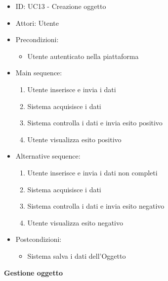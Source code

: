 \documentclass{article}
\begin{document}
\begin{itemize}[label = {-}]
    \itemsep0px
    \item ID: UC13 - Creazione oggetto
    \item Attori: Utente
    \item Precondizioni: 
        \begin{itemize}[label = {-}]
            \item Utente autenticato nella piattaforma
        \end{itemize}
    \item Main sequence: 
        \begin{enumerate}
            \item Utente inserisce e invia i dati
            \item Sistema acquisisce i dati
            \item Sistema controlla i dati e invia esito positivo
            \item Utente visualizza esito positivo
        \end{enumerate}
    \item Alternative sequence:
        \begin{enumerate}
            \item Utente inserisce e invia i dati non completi
            \item Sistema acquisisce i dati
            \item Sistema controlla i dati e invia esito negativo
            \item Utente visualizza esito negativo
        \end{enumerate}
    \item Postcondizioni: 
        \begin{itemize}[label = {-}]
            \item Sistema salva i dati dell'Oggetto
        \end{itemize}
\end{itemize}
\textbf{Gestione oggetto}
\end{document}
